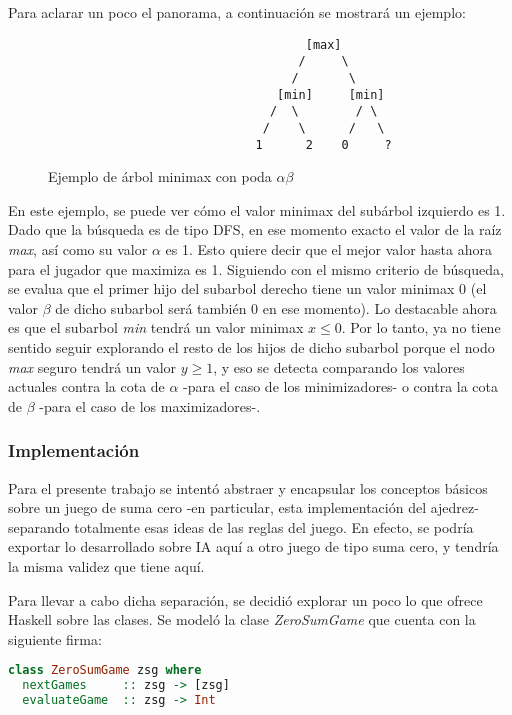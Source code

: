 \documentclass{llncs}
\begin{document}
Para aclarar un poco el panorama, a continuación se mostrará un ejemplo:

\begin{figure}
\begin{verbatim}
                                    [max]
                                   /     \
                                  /       \
                                [min]     [min]
                               /  \        / \
                              /    \      /   \
                             1      2    0     ?
\end{verbatim}
\caption{Ejemplo de árbol minimax con poda $\alpha\beta$}
\label{fig:ascii-box}
\end{figure}

En este ejemplo, se puede ver cómo el valor minimax del subárbol izquierdo es 1. Dado que la búsqueda es de tipo DFS, en ese momento exacto el valor de la raíz \textit{max}, así como su valor $\alpha$ es 1. Esto quiere decir que el mejor valor hasta ahora para el jugador que maximiza es 1. Siguiendo con el mismo criterio de búsqueda, se evalua que el primer hijo del subarbol derecho tiene un valor minimax 0 (el valor $\beta$ de dicho subarbol será también 0 en ese momento). Lo destacable ahora es que el subarbol \textit{min} tendrá un valor minimax $x \leq 0$. Por lo tanto, ya no tiene sentido seguir explorando el resto de los hijos de dicho subarbol porque el nodo \textit{max} seguro tendrá un valor $y \geq 1$, y eso se detecta comparando los valores actuales contra la cota de $\alpha$ -para el caso de los minimizadores- o contra la cota de $\beta$ -para el caso de los maximizadores-.

\subsubsection{ Implementación }

Para el presente trabajo se intentó abstraer y encapsular los conceptos básicos sobre un juego de suma cero -en particular, esta implementación del ajedrez- separando totalmente esas ideas de las reglas del juego. En efecto, se podría exportar lo desarrollado sobre IA aquí a otro juego de tipo suma cero, y tendría la misma validez que tiene aquí.

Para llevar a cabo dicha separación, se decidió explorar un poco lo que ofrece Haskell sobre las clases. Se modeló la clase \textit{ZeroSumGame} que cuenta con la siguiente firma:

\begin{lstlisting}[frame=single, language=haskell, captionpos=b, caption=Definición de la clase ZeroSumGame, label={lst:zero_sum_game_def}]
class ZeroSumGame zsg where
  nextGames     :: zsg -> [zsg]
  evaluateGame  :: zsg -> Int
\end{lstlisting}
\end{document}
